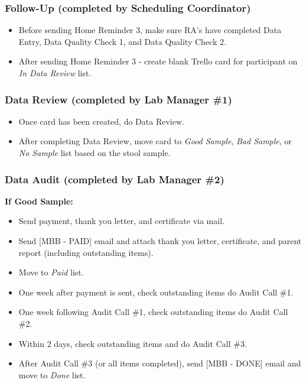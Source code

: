 \documentclass[]{book}
\providecommand{\tightlist}{%
  \setlength{\itemsep}{0pt}\setlength{\parskip}{0pt}}
\begin{document}
\hypertarget{follow-up-completed-by-scheduling-coordinator}{%
\subsubsection{Follow-Up (completed by Scheduling Coordinator)}\label{follow-up-completed-by-scheduling-coordinator}}

\begin{itemize}
\tightlist
\item
  Before sending Home Reminder 3, make sure RA's have completed Data Entry, Data Quality Check 1, and Data Quality Check 2.
\item
  After sending Home Reminder 3 - create blank Trello card for participant on \emph{In Data Review} list.
\end{itemize}

\hypertarget{data-review-completed-by-lab-manager-1}{%
\subsubsection{Data Review (completed by Lab Manager \#1)}\label{data-review-completed-by-lab-manager-1}}

\begin{itemize}
\tightlist
\item
  Once card has been created, do Data Review.
\item
  After completing Data Review, move card to \emph{Good Sample}, \emph{Bad Sample}, or \emph{No Sample} list based on the stool sample.
\end{itemize}

\hypertarget{data-audit-completed-by-lab-manager-2}{%
\subsubsection{Data Audit (completed by Lab Manager \#2)}\label{data-audit-completed-by-lab-manager-2}}

\textbf{If Good Sample:}

\begin{itemize}
\tightlist
\item
  Send payment, thank you letter, and certificate via mail.
\item
  Send {[}MBB - PAID{]} email and attach thank you letter, certificate, and parent report (including outstanding items).
\item
  Move to \emph{Paid} list.
\item
  One week after payment is sent, check outstanding items do Audit Call \#1.
\item
  One week following Audit Call \#1, check outstanding items do Audit Call \#2.
\item
  Within 2 days, check outstanding items and do Audit Call \#3.
\item
  After Audit Call \#3 (or all items completed), send {[}MBB - DONE{]} email and move to \emph{Done} list.
\end{itemize}
\end{document}
